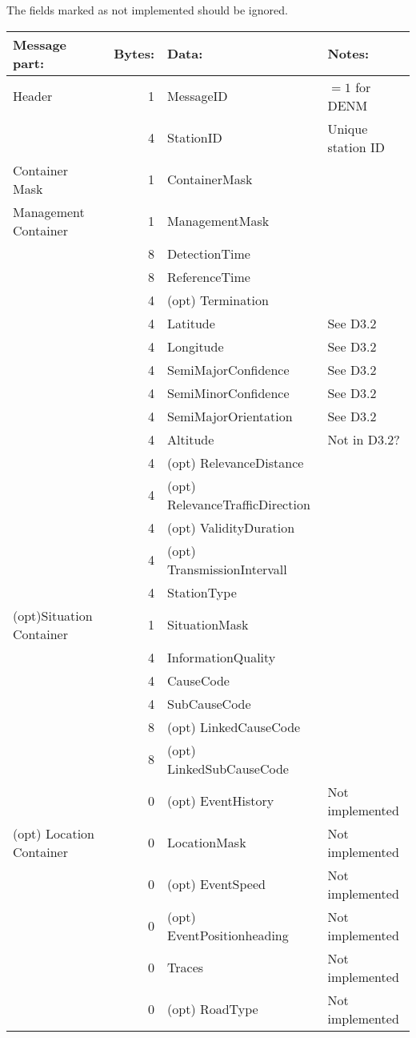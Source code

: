 \documentclass[11pt]{article}
\begin{document}
The fields marked as not implemented should be ignored.

\begin{center}
\begin{tabular}{lrll}
Message part: & Bytes: & Data: & Notes:\\
\hline
Header & 1 & MessageID & \(=1\) for DENM\\
 & 4 & StationID & Unique station ID\\
\hline
Container Mask & 1 & ContainerMask & \\
\hline
Management Container & 1 & ManagementMask & \\
 & 8 & DetectionTime & \\
 & 8 & ReferenceTime & \\
 & 4 & (opt) Termination & \\
 & 4 & Latitude & See D3.2\\
 & 4 & Longitude & See D3.2\\
 & 4 & SemiMajorConfidence & See D3.2\\
 & 4 & SemiMinorConfidence & See D3.2\\
 & 4 & SemiMajorOrientation & See D3.2\\
 & 4 & Altitude & Not in D3.2?\\
 & 4 & (opt) RelevanceDistance & \\
 & 4 & (opt) RelevanceTrafficDirection & \\
 & 4 & (opt) ValidityDuration & \\
 & 4 & (opt) TransmissionIntervall & \\
 & 4 & StationType & \\
\hline
(opt)Situation Container & 1 & SituationMask & \\
 & 4 & InformationQuality & \\
 & 4 & CauseCode & \\
 & 4 & SubCauseCode & \\
 & 8 & (opt) LinkedCauseCode & \\
 & 8 & (opt) LinkedSubCauseCode & \\
 & 0 & (opt) EventHistory & Not implemented\\
\hline
(opt) Location Container & 0 & LocationMask & Not implemented\\
 & 0 & (opt) EventSpeed & Not implemented\\
 & 0 & (opt) EventPositionheading & Not implemented\\
 & 0 & Traces & Not implemented\\
 & 0 & (opt) RoadType & Not implemented\\

\end{tabular}
\end{center}
\end{document}
